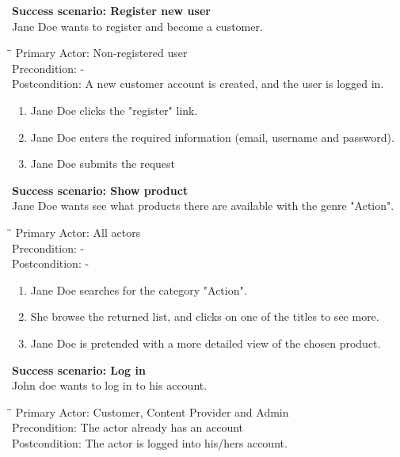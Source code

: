 \textbf{Success scenario: Register new user} \\
Jane Doe wants to register and become a customer. 
\begin{tabbing}
\hspace{5mm}\=\hspace{28mm}\=\kill
\>Primary Actor:\> Non-registered user\\
\>Precondition:\> -\\
\>Postcondition:\> A new customer account is created, and the user is logged in.
\end{tabbing}
\begin{enumerate} \setlength{\itemsep}{-1mm}
	\item Jane Doe clicks the "register" link.
	\item Jane Doe enters the required information (email, username and password).
	\item Jane Doe submits the request
\end{enumerate}
\vspace{3mm}
\textbf{Success scenario: Show product} \\
Jane Doe wants see what products there are available with the genre "Action".
\begin{tabbing}
\hspace{5mm}\=\hspace{26mm}\=\kill
\>Primary Actor:\> All actors\\
\>Precondition:\> -\\
\>Postcondition:\> -
\end{tabbing}
\begin{enumerate} \setlength{\itemsep}{-1mm}
	\item Jane Doe searches for the category "Action".
	\item She browse the returned list, and clicks on one of the titles to see more.
	\item Jane Doe is pretended with a more detailed view of the chosen product.
\end{enumerate}
\vspace{3mm}
\textbf{Success scenario: Log in} \\
John doe wants to log in to his account. 
\begin{tabbing}
\hspace{5mm}\=\hspace{26mm}\=\kill
\>Primary Actor:\> Customer, Content Provider and Admin\\
\>Precondition:\> The actor already has an account\\
\>Postcondition:\> The actor is logged into his/hers account.
\end{tabbing}
